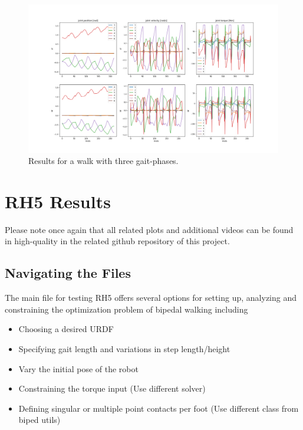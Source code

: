 \begin{figure}[h!]
\centering
\includegraphics[width=.7\linewidth]{Media/Crocoddyl/ExBiped/TalosGait_Solution.png}
\caption{Results for a walk with three gait-phases.}
\label{fig:TalosGait}
\end{figure}

  



\section{RH5 Results}
Please note once again that all related plots and additional videos can be found in high-quality in the related github repository \cite{julesserOCFrameworks} of this project.
\subsection{Navigating the Files}
The main file for testing RH5 offers several options for setting up, analyzing and constraining the optimization problem of bipedal walking including
\begin{itemize}
\item Choosing a desired URDF 
\item Specifying gait length and variations in step length/height
\item Vary the initial pose of the robot
\item Constraining the torque input (Use different solver)
\item Defining singular or multiple point contacts per foot (Use different class from biped utils)
\end{itemize}

